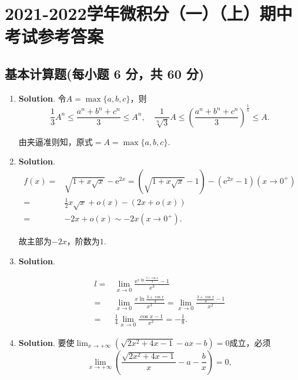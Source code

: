 \documentclass[../Main.tex]{subfiles}
\begin{document}
\chapter{2021-2022学年微积分（一）（上）期中考试参考答案}
\section{基本计算题(每小题 6 分，共 60 分)}
\begin{enumerate}
    \item \textbf{Solution}. 令$A=\max\{a,b,c\}$，则
          \[
              \frac{1}{3}A^{n}\leq\frac{a^{n}+b^{n}+c^{n}}{3}\leq A^{n},\quad \frac{1}{\sqrt[n]{3}}
              A\leq\left(\frac{a^{n}+b^{n}+c^{n}}{3}\right)^{\frac{1}{n}}\leq A.
          \]

          由夹逼准则知，原式$=A=\max\{a,b,c\}$.

    \item \textbf{Solution}.
          \[
              \begin{aligned}
                  f(x)= & \sqrt{1+x\sqrt{x}}-\mathrm{e}^{2x}=\left(\sqrt{1+x\sqrt{x}}-1\right)-\left(\mathrm{e}^{2x}-1\right)(x\to 0^{+}) \\
                  =     & \frac{1}{2}x\sqrt{x}+o(x)-(2x+o(x))                                                                             \\
                  =     & -2x+o(x)\sim -2x(x\to0^{+}).
              \end{aligned}
          \]

          故主部为$-2x$，阶数为$1$.

    \item \textbf{Solution}.

          \[
              \begin{aligned}
                  l= & \lim_{x\to0}\frac{\mathrm{e}^{x\ln\frac{3+\cos x}{4}}-1}{x^3}                               \\
                  =  & \lim_{x\to0}\frac{x\ln\frac{3+\cos x}{4}}{x^3}=\lim_{x\to0}\frac{\frac{3+\cos x}{4}-1}{x^2} \\
                  =  & \frac{1}{4}\lim_{x\to0}\frac{\cos x-1}{x^2}=-\frac{1}{8}.
              \end{aligned}
          \]

    \item \textbf{Solution}. 要使$\lim_{x\to+\infty}\left(\sqrt{2x^{2}+4x-1}-ax-b
              \right)=0$成立，必须
          \[
              \lim_{x\to+\infty}\left(\frac{\sqrt{2x^{2}+4x-1}}{x}-a-\frac{b}{x}\right)
              =0,
          \]


\end{enumerate}
\end{document}
